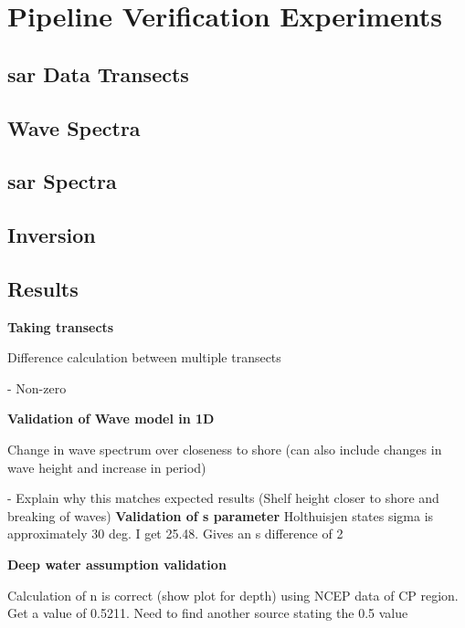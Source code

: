 \chapter{Pipeline Verification Experiments}
\label{chap:pipelineValidation}

\section{\acs{sar} Data Transects} \label{sec:pipelineVal.transects}




\section{Wave Spectra} \label{sec:pipelineVal.waveSpectra}




\section{\acs{sar} Spectra} \label{sec:pipelineVal.sarSpectra}



\section{Inversion} \label{sec:pipelineVal.inversion}



\section{Results} \label{sec:pipelineVal.results}




\textbf{Taking transects}

Difference calculation between multiple transects

- Non-zero


\textbf{Validation of Wave model in 1D}

Change in wave spectrum over closeness to shore (can also include changes in wave height and increase in period)

- Explain why this matches expected results (Shelf height closer to shore and breaking of waves)
\textbf{Validation of s parameter}
Holthuisjen states sigma is approximately 30 deg. I get 25.48. Gives an s difference of 2


\textbf{Deep water assumption validation}

Calculation of n is correct (show plot for depth) using NCEP data of CP region. Get a value of 0.5211. Need to find another source stating the 0.5 value

